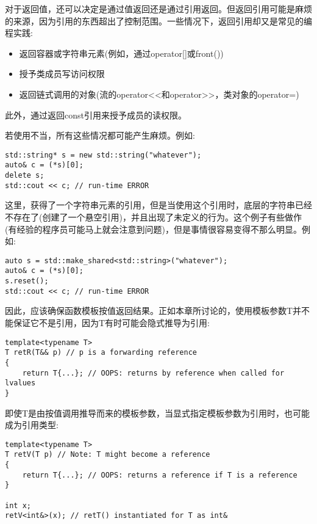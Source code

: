 

对于返回值，还可以决定是通过值返回还是通过引用返回。但返回引用可能是麻烦的来源，因为引用的东西超出了控制范围。一些情况下，返回引用却又是常见的编程实践:

\begin{itemize}
\item 
返回容器或字符串元素(例如，通过operator[]或front())

\item 
授予类成员写访问权限

\item 
返回链式调用的对象(流的operator<<和operator>>，类对象的operator=)
\end{itemize}

此外，通过返回const引用来授予成员的读权限。

若使用不当，所有这些情况都可能产生麻烦。例如:

\begin{lstlisting}[style=styleCXX]
std::string* s = new std::string("whatever");
auto& c = (*s)[0];
delete s;
std::cout << c; // run-time ERROR
\end{lstlisting}

这里，获得了一个字符串元素的引用，但是当使用这个引用时，底层的字符串已经不存在了(创建了一个悬空引用)，并且出现了未定义的行为。这个例子有些做作(有经验的程序员可能马上就会注意到问题)，但是事情很容易变得不那么明显。例如:

\begin{lstlisting}[style=styleCXX]
auto s = std::make_shared<std::string>("whatever");
auto& c = (*s)[0];
s.reset();
std::cout << c; // run-time ERROR
\end{lstlisting}

因此，应该确保函数模板按值返回结果。正如本章所讨论的，使用模板参数T并不能保证它不是引用，因为T有时可能会隐式推导为引用:

\begin{lstlisting}[style=styleCXX]
template<typename T>
T retR(T&& p) // p is a forwarding reference
{
	return T{...}; // OOPS: returns by reference when called for lvalues
}
\end{lstlisting}

即使T是由按值调用推导而来的模板参数，当显式指定模板参数为引用时，也可能成为引用类型:

\begin{lstlisting}[style=styleCXX]
template<typename T>
T retV(T p) // Note: T might become a reference
{
	return T{...}; // OOPS: returns a reference if T is a reference
}

int x;
retV<int&>(x); // retT() instantiated for T as int&
\end{lstlisting}

